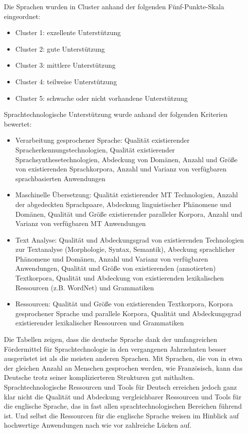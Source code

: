 \documentclass[]{../../metanetpaper}
\begin{document}
\begin{Parallel}[c]{80mm}{80mm}
{Die Sprachen wurden in Cluster anhand der folgenden Fünf-Punkte-Skala eingeordnet:
\begin{itemize}
\item Cluster 1: exzellente Unterstützung
\item Cluster 2: gute Unterstützung
\item Cluster 3: mittlere Unterstützung
\item Cluster 4: teilweise Unterstützung
\item Cluster 5: schwache oder nicht vorhandene Unterstützung
\end{itemize}
Sprachtechnologische Unterstützung wurde anhand der folgenden Kriterien bewertet:
\begin{itemize}
\item Verarbeitung gesprochener Sprache: Qualität existierender Spracherkennungstechnologien, Qualität existierender Sprachsynthesetechnologien, Abdeckung von Domänen, Anzahl und Größe von existierenden Sprachkorpora, Anzahl und Varianz von verfügbaren sprachbasierten Anwendungen
\item Maschinelle Übersetzung: Qualität existierender MT Technologien, Anzahl der abgedeckten Sprachpaare, Abdeckung linguistischer Phänomene und Domänen, Qualität und Größe existierender paralleler Korpora, Anzahl und Varianz von verfügbaren MT Anwendungen
\item Text Analyse: Qualität und Abdeckungsgrad von existierenden Technologien zur Textanalyse (Morphologie, Syntax, Semantik), Abeckung sprachlicher Phänomene und Domänen, Anzahl und Varianz von verfügbaren Anwendungen, Qualität und Größe von existierenden (annotierten) Textkorpora, Qualität und Abdeckung von existierenden lexikalischen Ressourcen (z.B. WordNet) und Grammatiken
\item Ressourcen: Qualität und Größe von existierenden Textkorpora, Korpora gesprochener Sprache und parallele Korpora, Qualität und Abdeckungsgrad existierender lexikalischer Ressourcen und Grammatiken
\end{itemize} 
Die Tabellen zeigen, dass die deutsche Sprache dank der umfangreichen Fördermittel für Sprachtechnologie in den vergangenen Jahrzehnten besser ausgerüstet ist als die meisten anderen Sprachen. Mit Sprachen, die von in etwa der gleichen Anzahl an Menschen gesprochen werden, wie Französisch, kann das Deutsche trotz seiner komplizierteren Strukturen gut mithalten. Sprachtechnologische Ressourcen und Tools für Deutsch erreichen jedoch ganz klar nicht die Qualität und Abdeckung vergleichbarer Ressourcen und Tools für die englische Sprache, das in fast allen sprachtechnologischen Bereichen führend ist. Und selbst die Ressourcen für die englische Sprache weisen im Hinblick auf hochwertige Anwendungen nach wie vor zahlreiche Lücken auf.

}
\end{Parallel}
\end{document}
